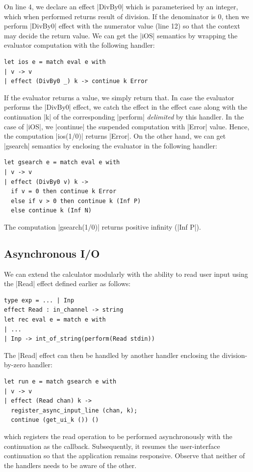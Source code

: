 \documentclass[sigplan,10pt,review,anonymous]{acmart}\settopmatter{printfolios=true,printccs=false,printacmref=false}
\begin{document}
On line 4, we declare an effect |DivBy0| which is parameterised by an integer,
which when performed returns result of division. If the denominator is 0, then
we perform |DivBy0| effect with the numerator value (line 12) so that the
context may decide the return value. We can get the |iOS| semantics by wrapping
the evaluator computation with the following handler:
\begin{lstlisting}
let ios e = match eval e with
| v -> v
| effect (DivBy0 _) k -> continue k Error
\end{lstlisting}
If the evaluator returns a value, we simply return that. In case the evaluator
performs the |DivBy0| effect, we catch the effect in the effect case along with
the continuation |k| of the corresponding |perform| \emph{delimited} by this
handler. In the case of |iOS|, we |continue| the suspended computation with
|Error| value. Hence, the computation |ios(1/0)| returns |Error|. On the
other hand, we can get |gsearch| semantics by enclosing the evaluator in the
following handler:
\begin{lstlisting}
let gsearch e = match eval e with
| v -> v
| effect (DivBy0 v) k ->
  if v = 0 then continue k Error
  else if v > 0 then continue k (Inf P)
  else continue k (Inf N)
\end{lstlisting}
The computation |gsearch(1/0)| returns positive infinity (|Inf P|).

\subsection{Asynchronous I/O}
\label{sec:aio}

We can extend the calculator modularly with the ability to read user input
using the |Read| effect defined earlier as follows:
\begin{lstlisting}
type exp = ... | Inp
effect Read : in_channel -> string
let rec eval e = match e with
| ...
| Inp -> int_of_string(perform(Read stdin))
\end{lstlisting}
The |Read| effect can then be handled by another handler enclosing the
division-by-zero handler:
\begin{lstlisting}
let run e = match gsearch e with
| v -> v
| effect (Read chan) k ->
  register_async_input_line (chan, k);
  continue (get_ui_k ()) ()
\end{lstlisting}
\noindent which registers the read operation to be performed asynchronously
with the continuation as the callback. Subsequently, it resumes the
user-interface continuation so that the application remains responsive. Observe
that neither of the handlers needs to be aware of the other.
\end{document}
